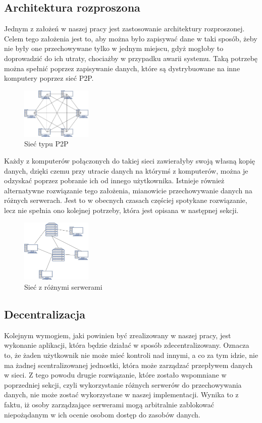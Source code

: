\subsection{Architektura rozproszona}
\label{sec:Rozproszenie}
Jednym z założeń w naszej pracy jest zastosowanie architektury rozproszonej. Celem tego założenia jest to, aby można było zapisywać dane w taki sposób, żeby nie były one przechowywane tylko w jednym miejscu, gdyż mogłoby to doprowadzić do ich utraty, chociażby w przypadku awarii systemu. Taką potrzebę można spełnić poprzez zapisywanie danych, które są dystrybuowane na inne komputery poprzez sieć P2P. 
\begin{figure}[!ht]
	\centering
		\includegraphics[width=0.3\textwidth]{Images/P2P.jpg}
	\caption{Sieć typu P2P}
	\label{fig:P2P}
\end{figure}
\newline Każdy z komputerów połączonych do takiej sieci zawierałyby swoją własną kopię danych, dzięki czemu przy utracie danych na którymś z komputerów, można je odzyskać poprzez pobranie ich od innego użytkownika.
Istnieje również alternatywne rozwiązanie tego założenia, mianowicie przechowywanie danych na różnych serwerach. Jest to w obecnych czasach częściej spotykane rozwiązanie, lecz nie spełnia ono kolejnej potrzeby, która jest opisana w następnej sekcji.
\begin{figure}[!ht]
	\centering
		\includegraphics[width=0.3\textwidth]{Images/Siec_serwery.jpg}
	\caption{Sieć z różnymi serwerami}
	\label{fig:SiecSerwery}
\end{figure}
\newline

\subsection{Decentralizacja}
\label{sec:Decentralizacja}
Kolejnym wymogiem, jaki powinien być zrealizowany w naszej pracy, jest wykonanie aplikacji, która będzie działać w sposób zdecentralizowany. Oznacza to, że żaden użytkownik nie może mieć kontroli nad innymi, a co za tym idzie, nie ma żadnej scentralizowanej jednostki, która może zarządzać przepływem danych w sieci. Z tego powodu drugie rozwiązanie, które zostało wspomniane w poprzedniej sekcji, czyli wykorzystanie różnych serwerów do przechowywania danych, nie może zostać wykorzystane w naszej implementacji. Wynika to z faktu, iż osoby zarządzające serwerami mogą arbitralnie zablokować niepożądanym w ich ocenie osobom dostęp do zasobów danych.

